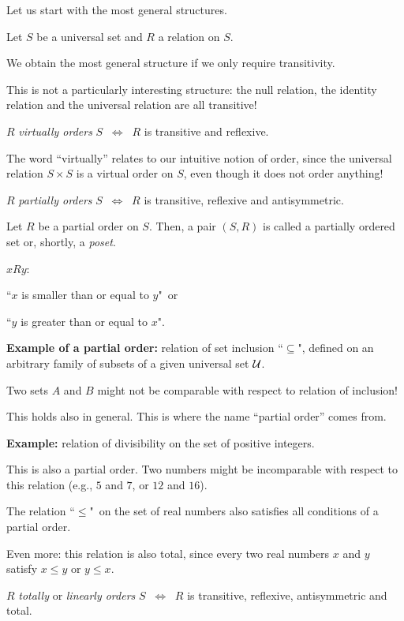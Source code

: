 \documentclass[11pt,paper=b5,footinclude,headinclude]{scrbook} %
\def\cee {{~\Leftrightarrow~}}
\theoremstyle{remark}
\theoremstyle{definition} %
\theoremstyle{theorem} %
\begin{document}
\bigskip
Let us start with the most general structures.

\bigskip

Let $S$ be a universal set and $R$ a relation on $S$.

We obtain the most general structure if we only require transitivity.

This is not a particularly interesting structure: the null relation, the identity relation and the universal relation are all transitive!

\bigskip
$R$ {\em virtually orders} $S$ $\cee$ $R$ is transitive and reflexive.

The word ``virtually'' relates to our intuitive notion of order, since the universal relation $S\times S$ is a virtual order on $S$, even though it does not order anything!

\medskip
$R$ {\em partially orders} $S$ $\cee$ $R$ is transitive, reflexive and antisymmetric.

\medskip
Let $R$ be a partial order on $S$. Then, a pair $(S,R)$ is called a partially ordered set or, shortly, a {\em poset}.

$xRy$:

``$x$ is smaller than or equal to $y$"~or

``$y$ is greater than or equal to $x$".

\medskip
\textbf{ Example of a partial order:} relation of set inclusion ``$\subseteq$", defined
on an arbitrary family of subsets of a given universal set ${\cal U}$.

Two sets $A$ and $B$ might not be comparable with respect to relation of inclusion!

This holds also in general. This is where the name ``partial order'' comes from.

\medskip
\textbf{ Example:} relation of divisibility on the set of positive integers.

This is also a partial order. Two numbers might be incomparable
with respect to this relation (e.g., $5$ and $7$, or $12$ and $16$).

\bigskip
The relation  ``$\le$"~on the set of real numbers also satisfies all conditions of a partial order.

Even more: this relation is also total, since every two real numbers $x$ and $y$ satisfy $x\le y$ or $y\le x$.


\bigskip

$R$ {\em totally} or {\em linearly orders} $S$ $\cee$ $R$ is transitive, reflexive,
antisymmetric and total.
\end{document}
